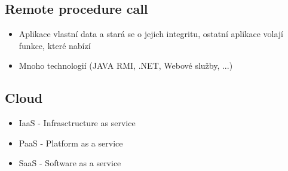   \subsection{Remote procedure call}
    \begin{itemize}
      \item Aplikace vlastní data a stará se o jejich integritu, ostatní aplikace volají funkce, které nabízí
      \item Mnoho technologií (JAVA RMI, .NET, Webové služby, ...)
    \end{itemize}

  \subsection{Cloud}
    \begin{itemize}
      \item IaaS - Infrasctructure as service
      \item PaaS - Platform as a service
      \item SaaS - Software as a service
    \end{itemize}
